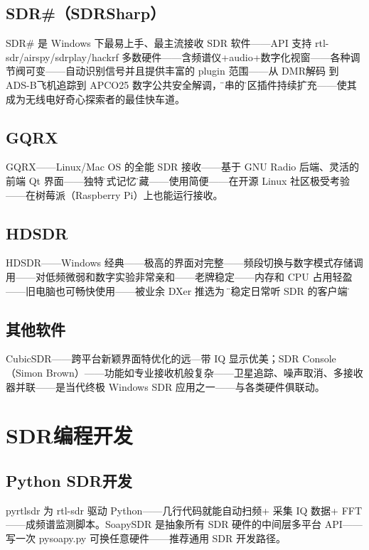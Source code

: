 \documentclass[12pt,UTF8]{ctexbook}
\begin{document}
\subsection{SDR\#（SDRSharp）}

SDR\# 是 Windows 下最易上手、最主流接收 SDR 软件——API 支持 rtl-sdr/airspy/sdrplay/hackrf 多数硬件——含频谱仪+audio+数字化视窗——各种调节阀可变——自动识别信号并且提供丰富的 plugin 范围——从 DMR解码 到 ADS-B飞机追踪到 APCO25 数字公共安全解调，\"一串的\"社区插件持续扩充——使其成为无线电好奇心探索者的最佳快车道。

\subsection{GQRX}

GQRX——Linux/Mac OS 的全能 SDR 接收——基于 GNU Radio 后端、灵活的前端 Qt 界面——独特\"模式记忆\"储藏——使用简便——在开源 Linux 社区极受考验——在树莓派（Raspberry Pi）上也能运行接收。

\subsection{HDSDR}

HDSDR——Windows 经典——极高的界面对完整——频段切换与数字模式存储调用——对低频微弱和数字实验非常亲和——老牌稳定——内存和 CPU 占用轻盈——旧电脑也可畅快使用——被业余 DXer 推选为 \"最稳定日常听 SDR 的客户端\"。

\subsection{其他软件}

CubicSDR——跨平台新颖界面特优化的远—带 IQ 显示优美；SDR Console（Simon Brown）——功能如专业接收机般复杂——卫星追踪、噪声取消、多接收器并联——是当代终极 Windows SDR 应用之一——与各类硬件俱联动。

\section{SDR编程开发}
\label{sec:sdr_programming}

\subsection{Python SDR开发}

pyrtlsdr 为 rtl-sdr 驱动 Python——几行代码就能自动扫频+ 采集 IQ 数据+ FFT——成频谱监测脚本。SoapySDR 是抽象所有 SDR 硬件的中间层多平台 API——写一次 pysoapy.py 可换任意硬件——推荐通用 SDR 开发路径。
\end{document}
